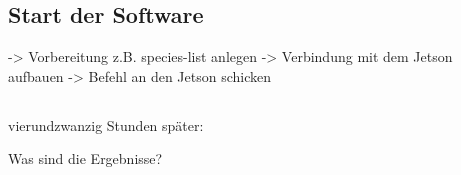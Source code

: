 \subsection{Start der Software}

-> Vorbereitung z.B. species-list anlegen
-> Verbindung mit dem Jetson aufbauen
-> Befehl an den Jetson schicken


\subsection{}

vierundzwanzig Stunden später:

Was sind die Ergebnisse?



